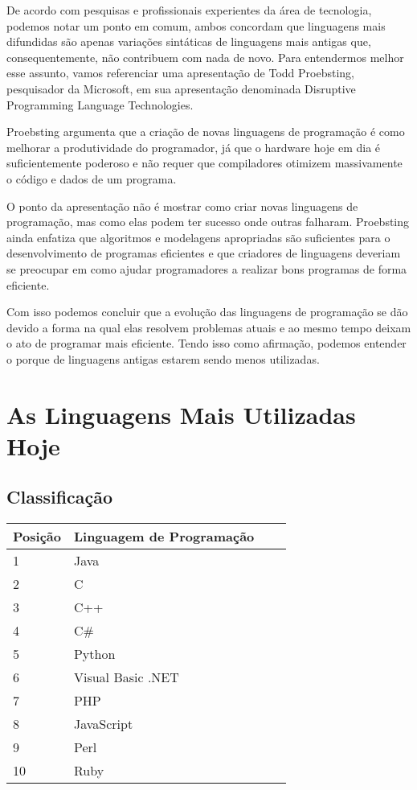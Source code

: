\documentclass[
    12pt,               %
    openright,          %
    twoside,            %
    a4paper,            %
    brazil              %
    ]{abntex2}
\begin{document}
De acordo com pesquisas e profissionais experientes da área de tecnologia,
podemos notar um ponto em comum, ambos concordam que linguagens mais difundidas
são apenas variações sintáticas de linguagens mais antigas que,
consequentemente, não contribuem com nada de novo.  Para entendermos melhor esse
assunto, vamos referenciar uma apresentação de Todd Proebsting, pesquisador da
Microsoft, em sua apresentação denominada Disruptive Programming Language
Technologies.\cite{proebsting2002disruptive}

Proebsting argumenta que a criação de novas linguagens de programação é como
melhorar a produtividade do programador, já que o hardware hoje em dia é
suficientemente poderoso e não requer que compiladores otimizem massivamente o
código e dados de um programa.

O ponto da apresentação não é mostrar como criar novas linguagens de
programação, mas como elas podem ter sucesso onde outras falharam.  Proebsting
ainda enfatiza que algoritmos e modelagens apropriadas são suficientes para o
desenvolvimento de programas eficientes e que criadores de linguagens deveriam
se preocupar em como ajudar programadores a realizar bons programas de forma
eficiente.

Com isso podemos concluir que a evolução das linguagens de programação se dão
devido a forma na qual elas resolvem problemas atuais e ao mesmo tempo deixam o
ato de programar mais eficiente. Tendo isso como afirmação, podemos entender o
porque de linguagens antigas estarem sendo menos utilizadas.

\chapter{As Linguagens Mais Utilizadas Hoje}

\section{Classificação}

\begin{center}
\begin{tabular}{ | l | l | l | p{5cm} |}
\hline
Posição & Linguagem de Programação \\ \hline
1 & Java \\ \hline
2 & C \\ \hline
3 & C++ \\ \hline
4 & C\# \\ \hline
5 & Python \\ \hline
6 & Visual Basic .NET \\ \hline
7 & PHP \\ \hline
8 & JavaScript \\ \hline
9 & Perl \\ \hline
10 & Ruby \\ \hline
\end{tabular}
\end{center}
\end{document}
